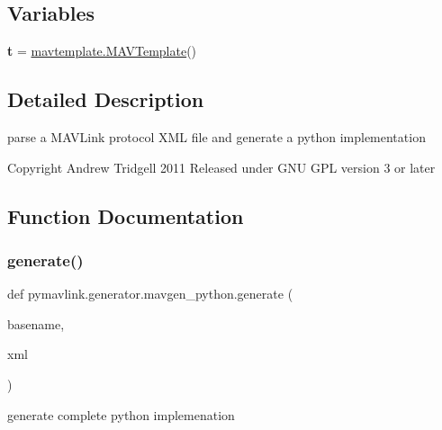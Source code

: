 \subsection*{Variables}
\begin{DoxyCompactItemize}
\item 
\mbox{\label{namespacepymavlink_1_1generator_1_1mavgen__python_afbc8a434637253009d3198fbb4f64b77}} 
{\bfseries t} = \hyperlink{classpymavlink_1_1generator_1_1mavtemplate_1_1MAVTemplate}{mavtemplate.\+M\+A\+V\+Template}()
\end{DoxyCompactItemize}


\subsection{Detailed Description}
\begin{DoxyVerb}parse a MAVLink protocol XML file and generate a python implementation

Copyright Andrew Tridgell 2011
Released under GNU GPL version 3 or later
\end{DoxyVerb}
 

\subsection{Function Documentation}
\mbox{\label{namespacepymavlink_1_1generator_1_1mavgen__python_aca7b16b5ead8d9f4c5a03ed6996b4776}} 
\subsubsection{\texorpdfstring{generate()}{generate()}}
{\footnotesize\ttfamily def pymavlink.\+generator.\+mavgen\+\_\+python.\+generate (\begin{DoxyParamCaption}\item[{}]{basename,  }\item[{}]{xml }\end{DoxyParamCaption})}

\begin{DoxyVerb}generate complete python implemenation\end{DoxyVerb}
 \mbox{\label{namespacepymavlink_1_1generator_1_1mavgen__python_aacfccd1b0104347f78648e168eac482d}} 
